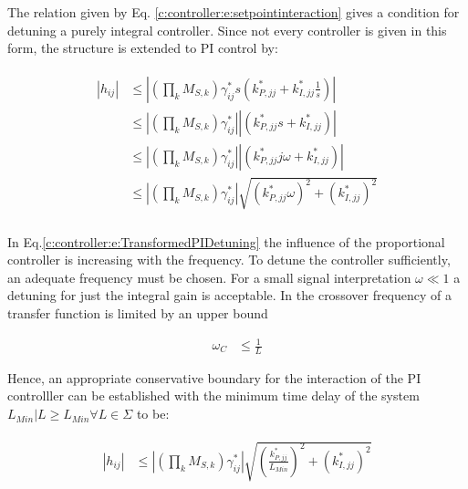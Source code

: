 The relation given by Eq. \ref{c:controller:e:setpointinteraction} gives a condition for detuning a purely integral controller. Since not every controller is given in this form, the structure is extended to PI control by:

\begin{align}
\begin{split}
\left|h_{ij}\right| &\leq \left| \left(\prod_k M_{S,k} \right) \gamma_{ij}^* s \left(k_{P,jj}^* + k_{I,jj}^* \frac{1}{s} \right) \right| \\
&\leq \left| \left(\prod_k M_{S,k} \right) \gamma_{ij}^*\right| \left|\left(k_{P,jj}^* s+ k_{I,jj}^* \right) \right| \\
&\leq \left| \left(\prod_k M_{S,k} \right) \gamma_{ij}^*\right| \left|\left(k_{P,jj}^* j\omega+ k_{I,jj}^* \right) \right| \\
&\leq \left| \left(\prod_k M_{S,k} \right) \gamma_{ij}^*\right| \sqrt{\left(k_{P,jj}^*\omega\right)^2+ \left(k_{I,jj}^*\right)^2} \\
\end{split}
\label{c:controller:e:TransformedPIDetuning}
\end{align}

In Eq.\ref{c:controller:e:TransformedPIDetuning} the influence of the proportional controller is increasing with the frequency. 
To detune the controller sufficiently, an adequate frequency must be chosen. For a small signal interpretation $\omega \ll 1$ a detuning for just the integral gain is acceptable. In \cite[p.172 f.]{Skogestad2005} the crossover frequency of a transfer function is limited by an upper bound

\begin{align}
\omega_C &\leq \frac{1}{L}
\end{align}

Hence, an appropriate conservative boundary for the interaction of the PI controlller can be established with the minimum time delay of the system $L_{Min} | L\geq L_{Min} \forall L \in \Sigma $ to be:

\begin{align}
\begin{split}
\left| h_{ij} \right| &\leq \left| \left(\prod_k M_{S,k} \right) \gamma_{ij}^*\right| \sqrt{\left(\frac{k_{P,jj}^*}{L_{Min}}\right)^2+ \left(k_{I,jj}^*\right)^2}
\end{split}
\label{c:controller:e:conservativePITuning}
\end{align}

